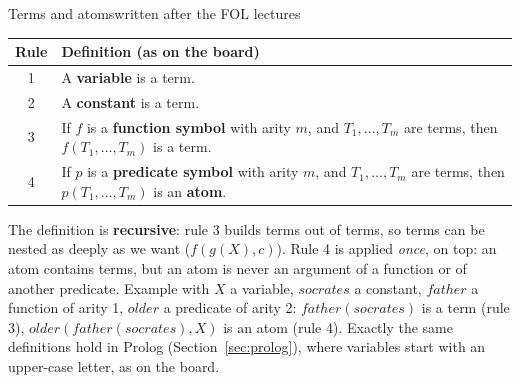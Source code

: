 \begin{nbwhiteboard}[label=wb:terms-atoms]{Terms and atoms}{written after the FOL lectures}
\begin{center}
\renewcommand{\arraystretch}{1.25}
\begin{tabularx}{\linewidth}{@{}c X@{}}
\toprule
\textbf{Rule} & \textbf{Definition (as on the board)} \\
\midrule
1 & A \textbf{variable} is a term. \\
2 & A \textbf{constant} is a term. \\
3 & If $f$ is a \textbf{function symbol} with arity $m$, and $T_1, \ldots, T_m$ are terms,
    then $f(T_1, \ldots, T_m)$ is a term. \\
4 & If $p$ is a \textbf{predicate symbol} with arity $m$, and $T_1, \ldots, T_m$ are
    terms, then $p(T_1, \ldots, T_m)$ is an \textbf{atom}. \\
\bottomrule
\end{tabularx}
\end{center}
\begin{center}
\end{center}
The definition is \textbf{recursive}: rule 3 builds terms out of terms, so terms can be
nested as deeply as we want ($f(g(X), c)$). Rule 4 is applied \emph{once}, on top: an atom
contains terms, but an atom is never an argument of a function or of another predicate.
Example with $X$ a variable, $\mathit{socrates}$ a constant, $\mathit{father}$ a
function of arity 1, $\mathit{older}$ a predicate of arity 2:
$\mathit{father}(\mathit{socrates})$ is a term (rule 3),
$\mathit{older}(\mathit{father}(\mathit{socrates}), X)$ is an atom (rule 4).
Exactly the same definitions hold in Prolog (Section~\ref{sec:prolog}), where variables
start with an upper-case letter, as on the board.
\end{nbwhiteboard}

